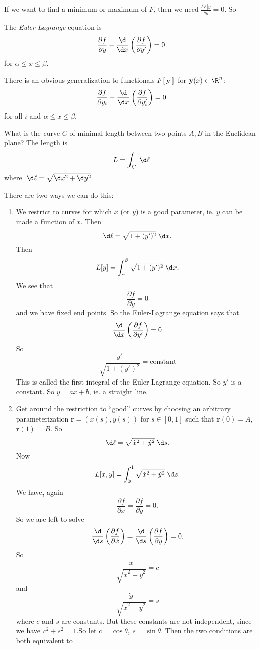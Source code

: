 \documentclass[a4paper]{article}
\begin{document}
If we want to find a minimum or maximum of $F$, then we need $\frac{\delta F[y}{\delta y} = 0$. So
\begin{defi}
  The \emph{Euler-Lagrange} equation is
  \[
    \frac{\partial f}{\partial y} - \frac{\d}{\d x}\left(\frac{\partial f}{\partial  y'}\right) = 0
  \]
  for $\alpha \leq x \leq \beta$.
\end{defi}
There is an obvious generalization to functionals $F[\mathbf{y}]$  for $\mathbf{y}(x) \in \R^n$:
\[
  \frac{\partial f}{\partial y_i} - \frac{\d }{\d x}\left(\frac{\partial f}{\partial y_i'}\right) = 0
\]
for all $i$ and $\alpha \leq x \leq \beta$.
\begin{eg}
  What is the curve $C$ of minimal length between two points $A, B$ in the Euclidean plane? The length is
  \[
    L = \int_C \;\d \ell
  \]
  where $\;\d \ell = \sqrt{\d x^2 + \d y^2}$.

  There are two ways we can do this:
  \begin{enumerate}
    \item We restrict to curves for which $x$ (or $y$) is a good parameter, ie. $y$ can be made a function of $x$. Then
      \[
        \d \ell = \sqrt{1 + (y')^2}\;\d x.
      \]
      Then
      \[
        L[y] = \int_\alpha^\beta \sqrt{1 + (y')^2}\;\d x.
      \]
      We see that
      \[
        \frac{\partial f}{\partial y} = 0
      \]
      and we have fixed end points. So the Euler-Lagrange equation says that
      \[
        \frac{\d}{\d x} \left(\frac{\partial f}{\partial y'}\right) = 0
      \]
      So
      \[
        \frac{y'}{\sqrt{1 + (y')^2}} = \text{constant}
      \]
      This is called the first integral of the Euler-Lagrange equation. So $y'$ is a constant. So $y = ax + b$, ie. a straight line.
    \item Get around the restriction to ``good'' curves by choosing an arbitrary parameterization $\mathbf{r} = (x(s), y(s))$ for $s\in [0, 1]$ such that $\mathbf{r}(0) = A$, $\mathbf{r}(1) = B$. So
      \[
        \d \ell = \sqrt{\dot x^2 + \dot y^2}\;\d s.
      \]
      Now
      \[
        L[x, y] = \int_0^1 \sqrt{\dot x^2 + \dot y^2} \;\d s.
      \]
      We have, again
      \[
        \frac{\partial f}{\partial x} = \frac{\partial f}{\partial y} = 0.
      \]
      So we are left to solve
      \[
        \frac{\d }{\d s}\left(\frac{\partial f}{\partial \dot x}\right) = \frac{\d }{\d s}\left(\frac{\partial f}{\partial \dot y}\right)  = 0.
      \]
      So
      \[
        \frac{\dot x}{\sqrt{\dot x^2 + \dot y^2}} = c
      \]
      and
      \[
        \frac{\dot y}{\sqrt{\dot x^2 + \dot y^2}} = s
      \]
      where $c$ and $s$ are constants. But these constants are not independent, since we have $c^2 + s^2 = 1$.So let $c = \cos \theta$, $s = \sin \theta$. Then the two conditions are both equivalent to
       

\end{enumerate}
\end{eg}
\end{document}
